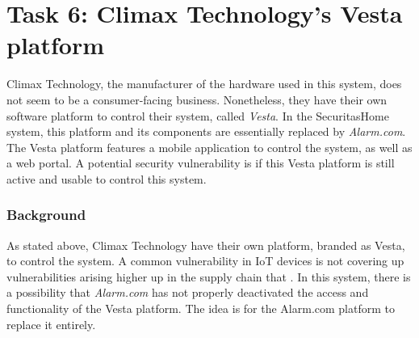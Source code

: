 \section{Task 6: Climax Technology's Vesta platform} \label{ch:pentesting:vesta}
Climax Technology, the manufacturer of the hardware used in this system, does not seem to be a consumer-facing business. Nonetheless, they have their own software platform to control their system, called \textit{Vesta}. In the SecuritasHome system, this platform and its components are essentially replaced by \textit{Alarm.com}. The Vesta platform features a mobile application to control the system, as well as a web portal. A potential security vulnerability is if this Vesta platform is still active and usable to control this system.

\subsubsection{Background}
As stated above, Climax Technology have their own platform, branded as Vesta, to control the system. A common vulnerability in IoT devices is not covering up vulnerabilities arising higher up in the supply chain that \cite{guzman2017iot}. In this system, there is a possibility that \textit{Alarm.com} has not properly deactivated the access and functionality of the Vesta platform. The idea is for the Alarm.com platform to replace it entirely.

